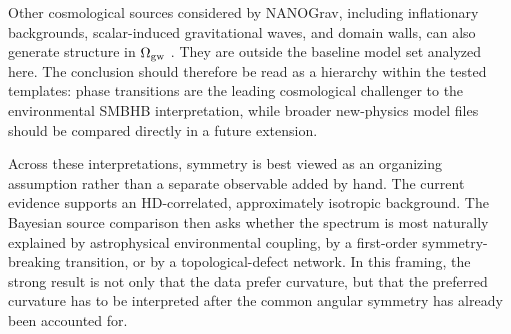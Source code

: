 \documentclass[symmetry,article,submit,pdftex,moreauthors]{Definitions/mdpi}
\begin{document}
Other cosmological sources considered by NANOGrav, including inflationary backgrounds, scalar-induced gravitational waves, and domain walls, can also generate structure in $\Omega_{\rm gw}$ \cite{NANOGrav15-NewPhys}. They are outside the baseline model set analyzed here. The conclusion should therefore be read as a hierarchy within the tested templates: phase transitions are the leading cosmological challenger to the environmental SMBHB interpretation, while broader new-physics model files should be compared directly in a future extension.

Across these interpretations, symmetry is best viewed as an organizing assumption rather than a separate observable added by hand. The current evidence supports an HD-correlated, approximately isotropic background. The Bayesian source comparison then asks whether the spectrum is most naturally explained by astrophysical environmental coupling, by a first-order symmetry-breaking transition, or by a topological-defect network. In this framing, the strong result is not only that the data prefer curvature, but that the preferred curvature has to be interpreted after the common angular symmetry has already been accounted for.
\end{document}
